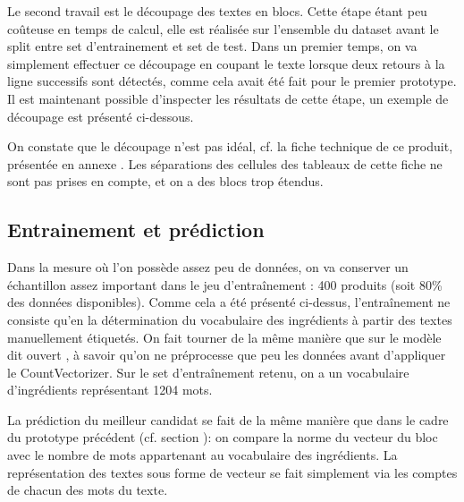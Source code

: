         Le second travail est le découpage des textes en blocs.
        Cette étape étant peu coûteuse en temps de calcul, elle est réalisée sur l'ensemble du dataset avant le split entre set d'entrainement et set de test.
        Dans un premier temps, on va simplement effectuer ce découpage en coupant le texte lorsque deux retours à la ligne successifs sont détectés, comme cela avait été fait pour le premier prototype.
        Il est maintenant possible d'inspecter les résultats de cette étape, un exemple de découpage est présenté ci-dessous.

        \begin{multicols}{3}
        \begin{spacing}{1.0}
        \label{blocks_examples}
        {\tiny
        
        }
        \end{spacing}
        \end{multicols}

        On constate que le découpage n'est pas idéal, cf. la fiche technique de ce produit, présentée en annexe .
        Les séparations des cellules des tableaux de cette fiche ne sont pas prises en compte, et on a des blocs trop étendus.

        \subsection{Entrainement et prédiction}

        Dans la mesure où l'on possède assez peu de données, on va conserver un échantillon assez important dans le jeu d'entraînement : 400 produits (soit 80\% des données disponibles).
        Comme cela a été présenté ci-dessus, l'entraînement ne consiste qu'en la détermination du vocabulaire des ingrédients à partir des textes manuellement étiquetés.        
        On fait tourner de la même manière que sur le modèle dit \og ouvert \fg, à savoir qu'on ne préprocesse que peu les données avant d'appliquer le CountVectorizer.
        Sur le set d'entraînement retenu, on a un vocabulaire d'ingrédients représentant 1204 mots.

        La prédiction du meilleur candidat se fait de la même manière que dans le cadre du prototype précédent (cf. section ): on compare la norme du vecteur du bloc avec le nombre de mots appartenant au vocabulaire des ingrédients.
        La représentation des textes sous forme de vecteur se fait simplement via les comptes de chacun des mots du texte.

